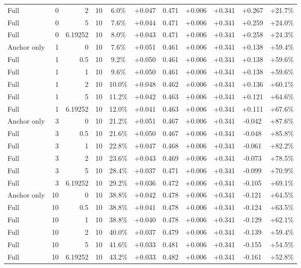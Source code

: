 \begin{table}[htbp]
\begin{tabular}{lrrrccccccc}
Full & 0 & 2 & 10 & 6.0\% & +0.047 & 0.471 & +0.006 & +0.341 & +0.267 & +21.7\% \\
Full & 0 & 5 & 10 & 7.6\% & +0.044 & 0.471 & +0.006 & +0.341 & +0.259 & +24.0\% \\
Full & 0 & 6.19252 & 10 & 8.0\% & +0.043 & 0.471 & +0.006 & +0.341 & +0.258 & +24.3\% \\
Anchor only & 1 & 0 & 10 & 7.6\% & +0.051 & 0.461 & +0.006 & +0.341 & +0.138 & +59.4\% \\
Full & 1 & 0.5 & 10 & 9.2\% & +0.050 & 0.461 & +0.006 & +0.341 & +0.138 & +59.6\% \\
Full & 1 & 1 & 10 & 9.6\% & +0.050 & 0.461 & +0.006 & +0.341 & +0.138 & +59.6\% \\
Full & 1 & 2 & 10 & 10.0\% & +0.048 & 0.462 & +0.006 & +0.341 & +0.136 & +60.1\% \\
Full & 1 & 5 & 10 & 11.2\% & +0.042 & 0.463 & +0.006 & +0.341 & +0.121 & +64.6\% \\
Full & 1 & 6.19252 & 10 & 12.0\% & +0.041 & 0.463 & +0.006 & +0.341 & +0.111 & +67.6\% \\
Anchor only & 3 & 0 & 10 & 21.2\% & +0.051 & 0.467 & +0.006 & +0.341 & -0.042 & +87.6\% \\
Full & 3 & 0.5 & 10 & 21.6\% & +0.050 & 0.467 & +0.006 & +0.341 & -0.048 & +85.8\% \\
Full & 3 & 1 & 10 & 22.8\% & +0.047 & 0.468 & +0.006 & +0.341 & -0.061 & +82.2\% \\
Full & 3 & 2 & 10 & 23.6\% & +0.043 & 0.469 & +0.006 & +0.341 & -0.073 & +78.5\% \\
Full & 3 & 5 & 10 & 28.4\% & +0.037 & 0.471 & +0.006 & +0.341 & -0.099 & +70.9\% \\
Full & 3 & 6.19252 & 10 & 29.2\% & +0.036 & 0.472 & +0.006 & +0.341 & -0.105 & +69.1\% \\
Anchor only & 10 & 0 & 10 & 38.8\% & +0.042 & 0.478 & +0.006 & +0.341 & -0.121 & +64.5\% \\
Full & 10 & 0.5 & 10 & 38.8\% & +0.041 & 0.478 & +0.006 & +0.341 & -0.124 & +63.5\% \\
Full & 10 & 1 & 10 & 38.8\% & +0.040 & 0.478 & +0.006 & +0.341 & -0.129 & +62.1\% \\
Full & 10 & 2 & 10 & 40.0\% & +0.037 & 0.479 & +0.006 & +0.341 & -0.139 & +59.4\% \\
Full & 10 & 5 & 10 & 41.6\% & +0.033 & 0.481 & +0.006 & +0.341 & -0.155 & +54.5\% \\
Full & 10 & 6.19252 & 10 & 43.2\% & +0.033 & 0.482 & +0.006 & +0.341 & -0.161 & +52.8\% \\

\end{tabular}
\end{table}

